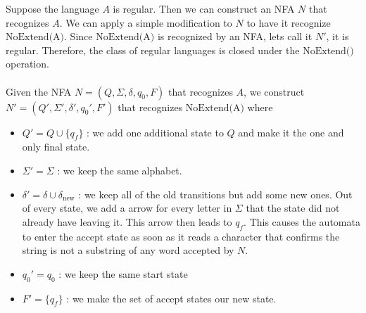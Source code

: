 \documentclass{article}
\begin{document}
Suppose the language $A$ is regular. Then we can construct an NFA $N$ that recognizes $A$. We can apply a simple modification to $N$ to have it recognize $\textrm{NoExtend(A)}$. Since $\textrm{NoExtend(A)}$ is recognized by an NFA, lets call it $N'$, it is regular. Therefore, the class of regular languages is closed under the $\textrm{NoExtend()}$ operation.\\\\
Given the NFA $N = (Q, \Sigma, \delta, q_0, F)$ that recognizes $A$, we construct $N' = (Q', \Sigma', \delta', q_0', F')$ that recognizes $\textrm{NoExtend(A)}$ where 
\begin{itemize}
    \item $Q' = Q \cup \{q_f\}$ : we add one additional state to $Q$ and make it the one and only final state.
    \item $\Sigma' = \Sigma$ : we keep the same alphabet.
    \item $\delta' = \delta \cup \delta_\textrm{new}$ : we keep all of the old transitions but add some new ones. Out of every state, we add a arrow for every letter in $\Sigma$ that the state did not already have leaving it. This arrow then leads to $q_f$. This causes the automata to enter the accept state as soon as it reads a character that confirms the string is not a substring of any word accepted by $N$.
    \item $q_0' = q_0$ : we keep the same start state
    \item $F' = \{q_f\}$ : we make the set of accept states our new state.
\end{itemize}
\end{document}
